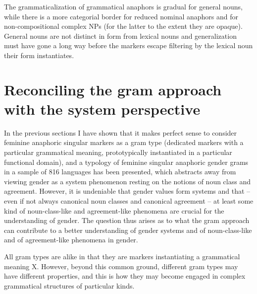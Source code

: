 \documentclass[output=collectionpaper]{langsci/langscibook}
\begin{document}
\begin{table}
\caption{Different properties of the subtypes of grammatical anaphors}
\label{tab:BW:10}
\end{table}

The grammaticalization of grammatical anaphors is gradual for general nouns, while there is a more categorial border for reduced nominal anaphors and for non-compositional complex NPs (for the latter to the extent they are opaque). General nouns are not distinct in form from lexical nouns and generalization must have gone a long way before the markers escape filtering by the lexical noun their form instantiates.



\section{Reconciling the gram approach with the system perspective}
\label{sec:BW:6}

In the previous sections I have shown that it makes perfect sense to consider feminine anaphoric singular markers as a gram type (dedicated markers with a particular grammatical meaning, prototypically instantiated in a particular functional domain), and a typology of feminine singular anaphoric gender grams in a sample of 816 languages has been presented, which abstracts away from viewing gender as a system phenomenon resting on the notions of noun class and agreement. However, it is undeniable that gender values form systems and that – even if not always canonical noun classes and canonical agreement – at least some kind of noun-class-like and agreement-like phenomena are crucial for the understanding of gender. The question thus arises as to what the gram approach can contribute to a better understanding of gender systems and of noun-class-like and of agreement-like phenomena in gender.

All gram types are alike in that they are markers instantiating a grammatical meaning X. However, beyond this common ground, different gram types may have different properties, and this is how they may become engaged in complex grammatical structures of particular kinds.
\end{document}
